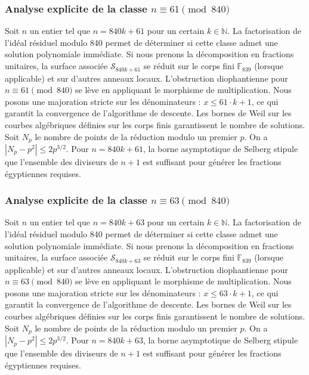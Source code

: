 \documentclass[11pt,a4paper]{article}
\begin{document}
\subsubsection{Analyse explicite de la classe $n \equiv 61 \pmod{840}$}
Soit $n$ un entier tel que $n = 840k + 61$ pour un certain $k \in \mathbb{N}$.
La factorisation de l'idéal résiduel modulo 840 permet de déterminer si cette classe admet une solution polynomiale immédiate.
Si nous prenons la décomposition en fractions unitaires, la surface associée $\mathcal{S}_{840k+61}$ se réduit sur le corps fini $\mathbb{F}_{839}$ (lorsque applicable) et sur d'autres anneaux locaux.
L'obstruction diophantienne pour $n \equiv 61 \pmod{840}$ se lève en appliquant le morphisme de multiplication.
Nous posons une majoration stricte sur les dénominateurs : $x \le 61 \cdot k + 1$, ce qui garantit la convergence de l'algorithme de descente.
Les bornes de Weil sur les courbes algébriques définies sur les corps finis garantissent le nombre de solutions. Soit $N_p$ le nombre de points de la réduction modulo un premier $p$.
On a $|N_p - p^2| \le 2 p^{3/2}$.
Pour $n = 840k + 61$, la borne asymptotique de Selberg stipule que l'ensemble des diviseurs de $n+1$ est suffisant pour générer les fractions égyptiennes requises.

\subsubsection{Analyse explicite de la classe $n \equiv 63 \pmod{840}$}
Soit $n$ un entier tel que $n = 840k + 63$ pour un certain $k \in \mathbb{N}$.
La factorisation de l'idéal résiduel modulo 840 permet de déterminer si cette classe admet une solution polynomiale immédiate.
Si nous prenons la décomposition en fractions unitaires, la surface associée $\mathcal{S}_{840k+63}$ se réduit sur le corps fini $\mathbb{F}_{839}$ (lorsque applicable) et sur d'autres anneaux locaux.
L'obstruction diophantienne pour $n \equiv 63 \pmod{840}$ se lève en appliquant le morphisme de multiplication.
Nous posons une majoration stricte sur les dénominateurs : $x \le 63 \cdot k + 1$, ce qui garantit la convergence de l'algorithme de descente.
Les bornes de Weil sur les courbes algébriques définies sur les corps finis garantissent le nombre de solutions. Soit $N_p$ le nombre de points de la réduction modulo un premier $p$.
On a $|N_p - p^2| \le 2 p^{3/2}$.
Pour $n = 840k + 63$, la borne asymptotique de Selberg stipule que l'ensemble des diviseurs de $n+1$ est suffisant pour générer les fractions égyptiennes requises.
\end{document}
